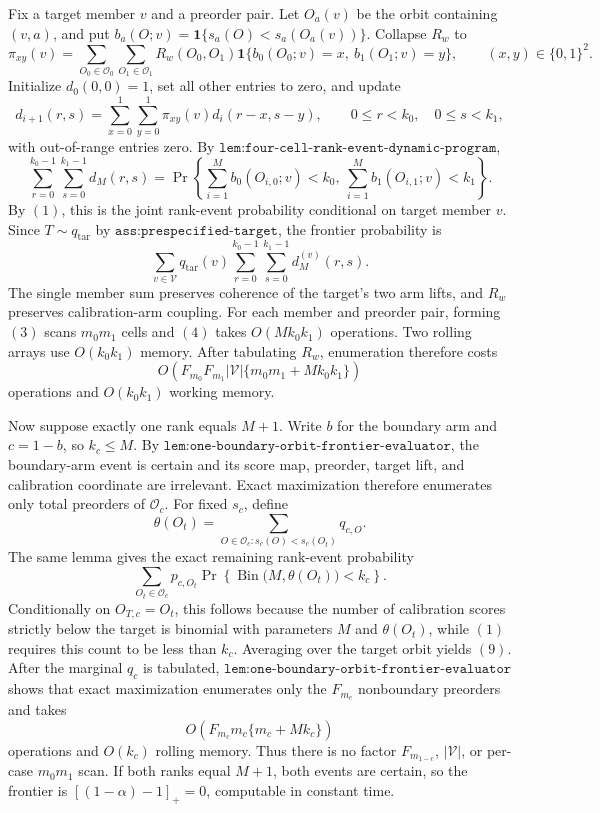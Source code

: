 Fix a target member \(v\) and a preorder pair. Let \(O_a(v)\) be the orbit containing \((v,a)\), and put \(b_a(O;v)=\mathbf 1\{s_a(O)<s_a(O_a(v))\}\). Collapse \(R_w\) to
\[
\pi_{xy}(v)=\sum_{O_0\in\mathcal O_0}\sum_{O_1\in\mathcal O_1}R_w(O_0,O_1)
\mathbf 1\{b_0(O_0;v)=x,\ b_1(O_1;v)=y\},
\qquad (x,y)\in\{0,1\}^2.
\tag{3}
\]
Initialize \(d_0(0,0)=1\), set all other entries to zero, and update
\[
d_{i+1}(r,s)=\sum_{x=0}^1\sum_{y=0}^1\pi_{xy}(v)d_i(r-x,s-y),
\qquad 0\le r<k_0,\quad 0\le s<k_1,
\tag{4}
\]
with out-of-range entries zero. By \(\texttt{lem:four-cell-rank-event-dynamic-program}\),
\[
\sum_{r=0}^{k_0-1}\sum_{s=0}^{k_1-1}d_M(r,s)
=
\Pr\!\left\{\sum_{i=1}^M b_0(O_{i,0};v)<k_0,\ \sum_{i=1}^M b_1(O_{i,1};v)<k_1\right\}.
\tag{5}
\]
By \((1)\), this is the joint rank-event probability conditional on target member \(v\). Since \(T\sim q_{\mathrm{tar}}\) by \(\texttt{ass:prespecified-target}\), the frontier probability is
\[
\sum_{v\in\mathcal V}q_{\mathrm{tar}}(v)
\sum_{r=0}^{k_0-1}\sum_{s=0}^{k_1-1}d_M^{(v)}(r,s).
\tag{6}
\]
The single member sum preserves coherence of the target's two arm lifts, and \(R_w\) preserves calibration-arm coupling. For each member and preorder pair, forming \((3)\) scans \(m_0m_1\) cells and \((4)\) takes \(O(Mk_0k_1)\) operations. Two rolling arrays use \(O(k_0k_1)\) memory. After tabulating \(R_w\), enumeration therefore costs
\[
O\!\left(F_{m_0}F_{m_1}|\mathcal V|\{m_0m_1+Mk_0k_1\}\right)
\tag{7}
\]
operations and \(O(k_0k_1)\) working memory.

Now suppose exactly one rank equals \(M+1\). Write \(b\) for the boundary arm and \(c=1-b\), so \(k_c\le M\). By \(\texttt{lem:one-boundary-orbit-frontier-evaluator}\), the boundary-arm event is certain and its score map, preorder, target lift, and calibration coordinate are irrelevant. Exact maximization therefore enumerates only total preorders of \(\mathcal O_c\). For fixed \(s_c\), define
\[
\theta(O_t)=\sum_{O\in\mathcal O_c:s_c(O)<s_c(O_t)}q_{c,O}.
\tag{8}
\]
The same lemma gives the exact remaining rank-event probability
\[
\sum_{O_t\in\mathcal O_c}p_{c,O_t}
\Pr\!\left\{\operatorname{Bin}\bigl(M,\theta(O_t)\bigr)<k_c\right\}.
\tag{9}
\]
Conditionally on \(O_{T,c}=O_t\), this follows because the number of calibration scores strictly below the target is binomial with parameters \(M\) and \(\theta(O_t)\), while \((1)\) requires this count to be less than \(k_c\). Averaging over the target orbit yields \((9)\). After the marginal \(q_c\) is tabulated, \(\texttt{lem:one-boundary-orbit-frontier-evaluator}\) shows that exact maximization enumerates only the \(F_{m_c}\) nonboundary preorders and takes
\[
O\!\left(F_{m_c}m_c\{m_c+Mk_c\}\right)
\tag{10}
\]
operations and \(O(k_c)\) rolling memory. Thus there is no factor \(F_{m_{1-c}}\), \(|\mathcal V|\), or per-case \(m_0m_1\) scan. If both ranks equal \(M+1\), both events are certain, so the frontier is \([(1-\alpha)-1]_+=0\), computable in constant time.

